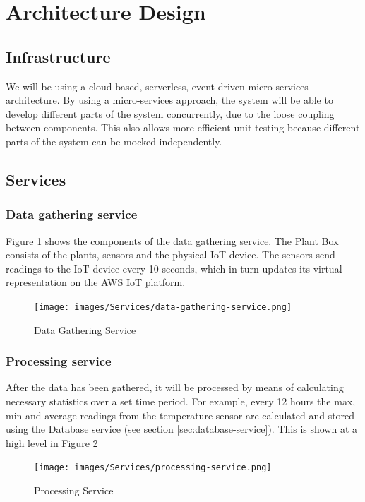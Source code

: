 \documentclass{article}
\begin{document}
\section{Architecture Design}

\subsection{Infrastructure}
We will be using a cloud-based, serverless, event-driven micro-services architecture. By using a micro-services approach, the system will be able to develop different parts of the system concurrently, due to the loose coupling between components. This also allows more efficient unit testing because different parts of the system can be mocked independently. 

\subsection{Services}

\subsubsection{Data gathering service}
Figure \ref{fig:data-gathering} shows the components of the data gathering service. The Plant Box consists of the plants, sensors and the physical IoT device. The sensors send readings to the IoT device every 10 seconds, which in turn updates its virtual representation on the AWS IoT platform.

\begin{figure}[h!]
  \texttt{[image: images/Services/data-gathering-service.png]}
  \caption{Data Gathering Service}
  \label{fig:data-gathering}
\end{figure}

\subsubsection{Processing service}
After the data has been gathered, it will be processed by means of calculating necessary statistics over a set time period. For example, every 12 hours the max, min and average readings from the temperature sensor are calculated and stored using the Database service (see section \ref{sec:database-service}). This is shown at a high level in Figure \ref{fig:processing-service}

\begin{figure}[h!]
  \texttt{[image: images/Services/processing-service.png]}
  \caption{Processing Service}
  \label{fig:processing-service}
\end{figure}
\end{document}
